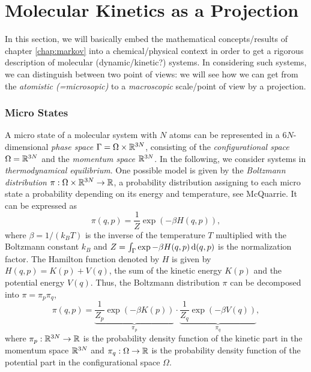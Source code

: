 \section{Molecular Kinetics as a Projection}
\label{sec:projection}

In this section, we will basically embed the mathematical concepts/results of chapter \ref{chap:markov} into a chemical/physical context in order to get a rigorous description of molecular (dynamic/kinetic?) systems. In considering such systems, we can distinguish between two point of views: we will see how we can get from the \textit{atomistic (=microsopic)} to a  \textit{macroscopic} scale/point of view by a projection.

\subsubsection*{Micro States}
A micro state of a molecular system with $N$ atoms can be represented in a $6N$-dimensional \textit{phase space} $\Gamma = \Omega \times {\mathbb{R}^{3N}}$, 
consisting of the \textit{configurational space} $\Omega = {\mathbb{R}^{3N}}$ and the \textit{momentum space} ${\mathbb{R}^{3N}}$. In the following, we consider systems in \textit{thermodynamical equilibrium}.
One possible model is given by the \textit{Boltzmann distribution} $\pi: \Omega \times \mathbb{R}^{3N} \rightarrow \mathbb{R}$, a
probability distribution assigning to each micro state a probability depending on its energy and temperature,
see McQuarrie\cite{mcquarrie2000}. It can be expressed as
\begin{equation}
\pi(q,p) = \frac{1}{Z} \exp{(-\beta H(q,p))},
\end{equation}
where $\beta = 1/ (k_BT)$ is the inverse of the temperature $T$ multiplied with the Boltzmann constant $k_B$
and $Z= \int_\Gamma \exp{-\beta H(q,p)} \mathop{}\!\mathrm{d}(q,p)$ is the normalization factor. The Hamilton function denoted by $H$ is given by $H(q,p) = K(p)+V(q)$, the sum of the kinetic energy $K(p)$ and the potential energy $V(q)$.
Thus, the Boltzmann distribution $\pi$ can be decomposed into $\pi = \pi_p \pi_q$,
\begin{equation*}
\pi(q,p) =  \underbrace{\frac{1}{Z_p} \exp{(-\beta K(p))}}_{\pi_p} \cdot
\underbrace{\frac{1}{Z_q} \exp{(-\beta V(q))}}_{\pi_q},
\end{equation*}
where $\pi_p: \mathbb{R}^{3N}  \rightarrow \mathbb{R}$ is the probability density function of the kinetic part in the momentum space $\mathbb{R}^{3N}$ and $\pi_q: \Omega \rightarrow \mathbb{R}$ is the probability density function of the potential part in the configurational space $\Omega$.


